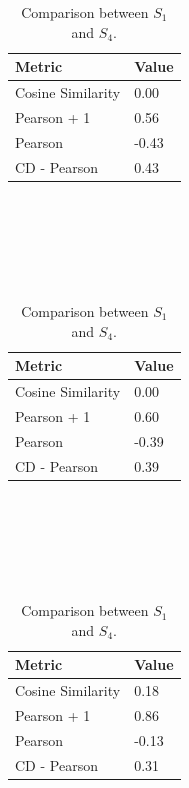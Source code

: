 \begin{table}[!htb]
    \begin{subtable}{.5\linewidth}
        \centering
        
            \begin{tabular}{ll}
            \hline
            Metric            & Value  \\
            \hline
            Cosine Similarity &  0.00  \\
            Pearson + 1       &  0.56  \\
            Pearson           & -0.43  \\
            CD - Pearson      &  0.43  \\
            \hline
            \end{tabular}\\
            \\
            \caption{Comparison between $S_1$ and $S_2$.}\\ 
            \\
            
            \begin{tabular}{ll}
            \\
            \hline
            Metric            & Value  \\
            \hline
            Cosine Similarity &  0.00  \\
            Pearson + 1       &  0.60  \\
            Pearson           & -0.39  \\
            CD - Pearson      &  0.39  \\
            \hline
            \end{tabular}\\
            \\
            \caption{Comparison between $S_1$ and $S_3$.}\\
            \\
            
            \begin{tabular}{ll}
            \\
            \hline
            Metric            & Value  \\
            \hline
            Cosine Similarity &  0.18  \\
            Pearson + 1       &  0.86  \\
            Pearson           & -0.13  \\
            CD - Pearson      &  0.31  \\
            \hline
            \end{tabular}\\
            \\
            \caption{Comparison between $S_1$ and $S_4$.}\\
            \\
            

\end{subtable}
\end{table}
